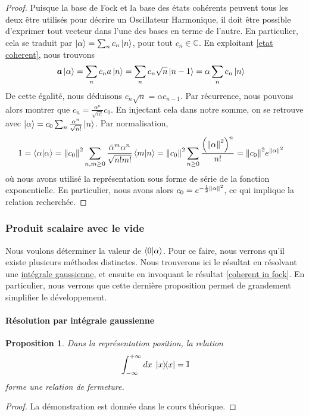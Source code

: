 \documentclass[11pt,oneside,a4paper]{article}
\newtheorem{property}[theorem]{Proposition}
\begin{document}
\begin{proof}
  Puisque la base de Fock et la base des états cohérents peuvent tous les deux être utilisés pour décrire un Oscillateur Harmonique, il doit être possible d'exprimer tout vecteur dans l'une des bases en terme de l'autre. En particulier, cela se traduit par $\ket{\alpha} = \sum_n c_n \ket{n}$, pour tout $c_n\in\mathbb{C}$. En exploitant \eqref{etat coherent}, nous trouvons
  \begin{align*}
    \bm{a}\ket{\alpha} = \sum_n c_n a\ket{n} = \sum_n c_n\sqrt{n}\ket{n-1} &= \alpha\sum_n c_n \ket{n}
  \end{align*}
  De cette égalité, nous déduisons $c_n\sqrt{n}=\alpha c_{n-1}$. Par récurrence, nous pouvons alors montrer que $c_n = \frac{\alpha^n}{\sqrt{n!}}c_0$. En injectant cela dans notre somme, on se retrouve avec $\ket{\alpha} = c_0\sum_n \frac{\alpha^n}{\sqrt{n!}}\ket{n}$. Par normalisation,
  \begin{align*}
    1 = \braket{\alpha} &= \norm{c_0}^2 \sum_{n,m\geq 0} \frac{\bar{\alpha}^m\alpha^n}{\sqrt{n!m!}}\braket{m}{n} = \norm{c_0}^2\sum_{n\geq 0} \frac{\left(\norm{\alpha}^2\right)^n}{n!} = \norm{c_0}^2e^{\norm{\alpha}^2}
  \end{align*}
  où nous avons utilisé la représentation sous forme de série de la fonction exponentielle. En particulier, nous avons alors $c_0 = e^{-\frac{1}{2}\norm{\alpha}^2}$, ce qui implique la relation recherchée.
\end{proof}

\subsubsection{Produit scalaire avec le vide}
\label{intégrale gaussienne}
Nous voulons déterminer la valeur de $\braket{0}{\alpha}$. Pour ce faire, nous verrons qu'il existe plusieurs méthodes distinctes. Nous trouverons ici le résultat en résolvant une \href{https://en.wikipedia.org/wiki/Gaussian_integral}{intégrale gaussienne}, et ensuite en invoquant le résultat \ref{coherent in fock}. En particulier, nous verrons que cette dernière proposition permet de grandement simplifier le développement.
\paragraph{Résolution par intégrale gaussienne}

\begin{property}
  Dans la représentation position, la relation
  \begin{equation}
    \int_{-\infty}^{+\infty}dx \; \ketbra{x} = \mathbb{I}
  \end{equation}
  forme une relation de fermeture.
\end{property}
\begin{proof}
  La démonstration est donnée dans le cours théorique.
\end{proof}
\end{document}
